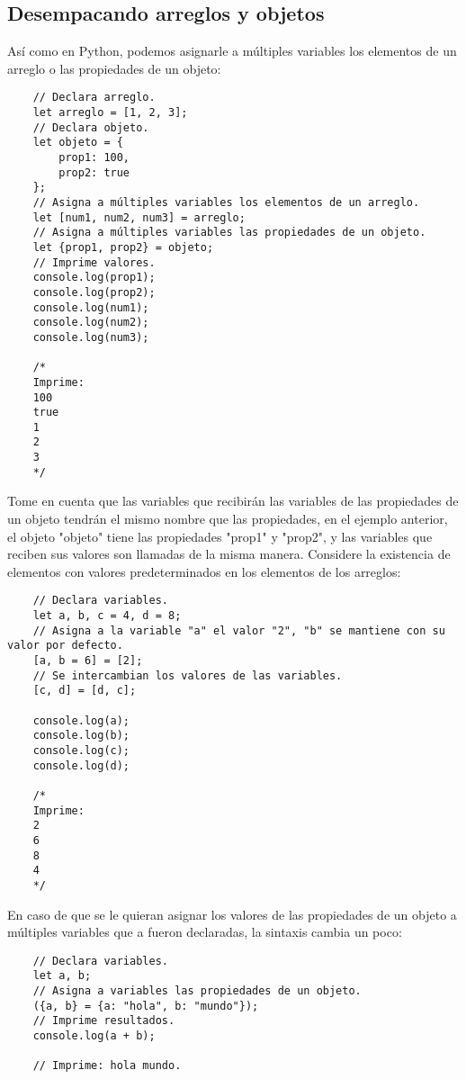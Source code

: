 \subsection{Desempacando arreglos y objetos}
\hspace{0.55cm}Así como en Python, podemos asignarle a múltiples variables los elementos de un arreglo o las propiedades de un objeto:
\begin{lstlisting}
    // Declara arreglo.
    let arreglo = [1, 2, 3];
    // Declara objeto.
    let objeto = {
        prop1: 100,
        prop2: true
    };
    // Asigna a múltiples variables los elementos de un arreglo.
    let [num1, num2, num3] = arreglo;
    // Asigna a múltiples variables las propiedades de un objeto.
    let {prop1, prop2} = objeto;
    // Imprime valores.
    console.log(prop1);
    console.log(prop2);
    console.log(num1);
    console.log(num2);
    console.log(num3);

    /*
    Imprime:
    100
    true
    1
    2
    3
    */
\end{lstlisting}

Tome en cuenta que las variables que recibirán las variables de las propiedades de un objeto tendrán el mismo nombre que las propiedades, en el ejemplo anterior, el objeto "objeto" tiene las propiedades "prop1" y "prop2", y las variables que reciben sus valores son llamadas de la misma manera. Considere la existencia de elementos con valores predeterminados en los elementos de los arreglos:
\begin{lstlisting}
    // Declara variables.
    let a, b, c = 4, d = 8;
    // Asigna a la variable "a" el valor "2", "b" se mantiene con su valor por defecto.
    [a, b = 6] = [2];
    // Se intercambian los valores de las variables.
    [c, d] = [d, c];

    console.log(a);
    console.log(b);
    console.log(c);
    console.log(d);

    /*
    Imprime:
    2
    6
    8
    4
    */
\end{lstlisting}

En caso de que se le quieran asignar los valores de las propiedades de un objeto a múltiples variables que a fueron declaradas, la sintaxis cambia un poco:
\begin{lstlisting}
    // Declara variables.
    let a, b;
    // Asigna a variables las propiedades de un objeto.
    ({a, b} = {a: "hola", b: "mundo"});
    // Imprime resultados.
    console.log(a + b);

    // Imprime: hola mundo.
\end{lstlisting}

